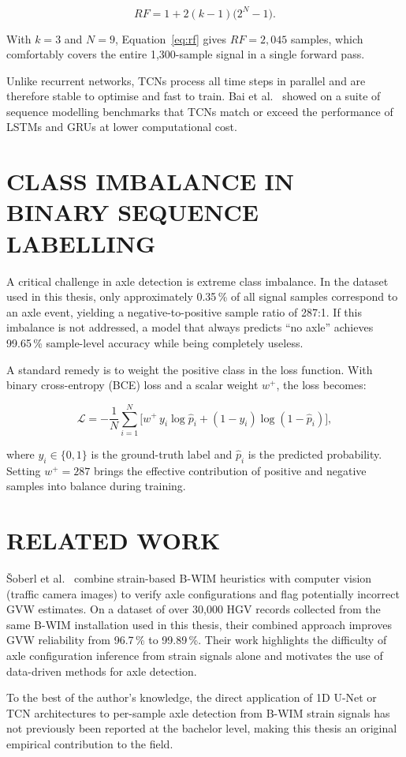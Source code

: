 \begin{equation}
    RF = 1 + 2(k-1)\bigl(2^{N}-1\bigr).
    \label{eq:rf}
\end{equation}

With $k=3$ and $N=9$, Equation~\ref{eq:rf} gives $RF=2{,}045$ samples, which
comfortably covers the entire 1,300-sample signal in a single forward pass.

Unlike recurrent networks, TCNs process all time steps in parallel and are
therefore stable to optimise and fast to train. Bai et al.\ \cite{Bai2018} showed
on a suite of sequence modelling benchmarks that TCNs match or exceed the
performance of LSTMs and GRUs at lower computational cost.

\section{CLASS IMBALANCE IN BINARY SEQUENCE LABELLING}

A critical challenge in axle detection is extreme class imbalance. In the dataset
used in this thesis, only approximately 0.35\,\% of all signal samples correspond
to an axle event, yielding a negative-to-positive sample ratio of 287:1. If this
imbalance is not addressed, a model that always predicts ``no axle'' achieves
99.65\,\% sample-level accuracy while being completely useless.

A standard remedy is to weight the positive class in the loss function. With
binary cross-entropy (BCE) loss and a scalar weight $w^{+}$, the loss becomes:

\begin{equation}
    \mathcal{L} = -\frac{1}{N}\sum_{i=1}^{N}
        \bigl[ w^{+}\, y_i \log \hat{p}_i
              + (1-y_i) \log(1-\hat{p}_i) \bigr],
    \label{eq:bce}
\end{equation}

where $y_i \in \{0,1\}$ is the ground-truth label and $\hat{p}_i$ is the
predicted probability. Setting $w^{+} = 287$ brings the effective contribution of
positive and negative samples into balance during training.

\section{RELATED WORK}

\v{S}oberl et al.\ \cite{Soberl2025} combine strain-based B-WIM heuristics with
computer vision (traffic camera images) to verify axle configurations and flag
potentially incorrect GVW estimates. On a dataset of over 30,000 HGV records
collected from the same B-WIM installation used in this thesis, their combined
approach improves GVW reliability from 96.7\,\% to 99.89\,\%. Their work
highlights the difficulty of axle configuration inference from strain signals
alone and motivates the use of data-driven methods for axle detection.

To the best of the author's knowledge, the direct application of 1D U-Net or TCN
architectures to per-sample axle detection from B-WIM strain signals has not
previously been reported at the bachelor level, making this thesis an original
empirical contribution to the field.